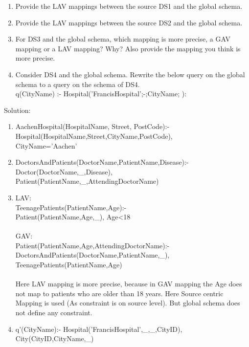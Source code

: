 \documentclass[10pt]{article}
\begin{document}
	\begin{enumerate}
		\item Provide the LAV mappings between the source DS1 and the global schema.
		\item Provide the LAV mappings between the source DS2 and the global schema.
		\item For DS3 and the global schema, which mapping is more precise, a GAV mapping or a LAV
		mapping? Why? Also provide the mapping you think is more precise.
		\item Consider DS4 and the global schema. Rewrite the below query on the global schema to a
		query on the schema of DS4. 
		\\q(CityName) :- Hospital('FrancisHospital';-;CityName; ):
	\end{enumerate}
	Solution: 
	\begin{enumerate}
		\item AachenHospital(HospitalName, Street, PostCode):-
		\\Hospital(HospitalName,Street,CityName,PostCode),\\ CityName='Aachen'
		\item DoctorsAndPatients(DoctorName,PatientName,Disease):-
		\\Doctor(DoctorName,\_,Disease),
		\\Patient(PatientName,\_,AttendingDoctorName)
		\item LAV:\\ TeenagePatients(PatientName,Age):-
		\\Patient(PatientName,Age,\_), Age<18
		\\ \\GAV:\\Patient(PatientName,Age,AttendingDoctorName):-
		\\DoctorsAndPatients(DoctorName,PatientName,\_),
		\\TeenagePatients(PatientName,Age)
		\\ \\Here LAV mapping is more precise, because in GAV mapping the Age does not map to patients who are older than 18 years. Here Source centric Mapping is used (As constraint is on source level). But global schema does not define any constraint.
		\item q'(CityName):- Hospital('FrancisHospital',\_,\_,CityID), City(CityID,CityName,\_)
	\end{enumerate}
	
	\clearpage
\end{document}
